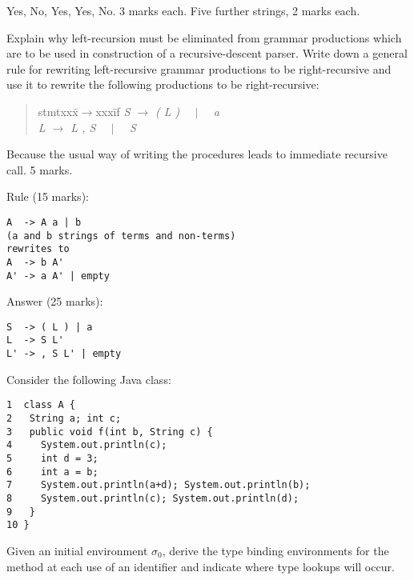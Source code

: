 \documentclass[11pt]{bareexam}
\begin{document}
\begin{questions}
\begin{subquestions}
\begin{modelanswer}
Yes, No, Yes, Yes, No. 3 marks each. 
Five further strings, 2 marks each.
\end{modelanswer}

\subquestion

Explain why left-recursion must be eliminated from
grammar productions which are to be used in
construction of a recursive-descent parser.
Write down a general rule for rewriting left-recursive
grammar productions to be right-recursive and use it to 
rewrite the following productions to be right-recursive:
\begin{quote}
\begin{tabbing}
stmtxxx\=$\rightarrow$xxx\=if\kill
\it
S \> $\rightarrow$ \> ( {\it L\/} ) \ \  $\mid$ \ \  {\it a} \\
\it
L    \> $\rightarrow$ \> {\it L\/} , {\it S\/} \ \  $\mid$ \ \  {\it S} \\
\end{tabbing}
\end{quote}
\vspace{-1em}

\begin{modelanswer}
Because the usual way of writing the 
procedures leads to immediate recursive call. 5 marks.

Rule (15 marks):
\begin{verbatim}
A  -> A a | b
(a and b strings of terms and non-terms)
rewrites to 
A  -> b A'
A' -> a A' | empty
\end{verbatim}
Answer (25 marks):
\begin{verbatim}
S  -> ( L ) | a
L  -> S L'
L' -> , S L' | empty
\end{verbatim}
\end{modelanswer}

\subquestion
Consider the following Java class:
\begin{verbatim}
1  class A {
2   String a; int c;
3   public void f(int b, String c) {
4     System.out.println(c);
5     int d = 3;
6     int a = b;
7     System.out.println(a+d); System.out.println(b);
8     System.out.println(c); System.out.println(d);
9   }
10 }
\end{verbatim}
Given an initial environment $\sigma_0$, 
derive the type binding environments for the method at each
use of an identifier and indicate where type lookups will occur.


\end{subquestions}
\end{questions}
\end{document}
